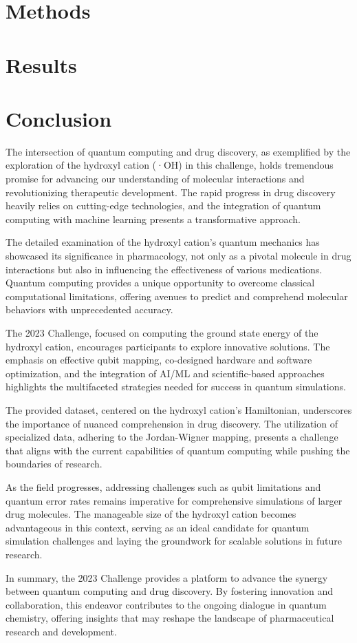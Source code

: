 \documentclass{article}
\begin{document}
\section{Methods}



\section{Results}

\section{Conclusion}
The intersection of quantum computing and drug discovery, as exemplified by the exploration of the hydroxyl cation (·OH) in this challenge, holds tremendous promise for advancing our understanding of molecular interactions and revolutionizing therapeutic development. The rapid progress in drug discovery heavily relies on cutting-edge technologies, and the integration of quantum computing with machine learning presents a transformative approach.

The detailed examination of the hydroxyl cation's quantum mechanics has showcased its significance in pharmacology, not only as a pivotal molecule in drug interactions but also in influencing the effectiveness of various medications. Quantum computing provides a unique opportunity to overcome classical computational limitations, offering avenues to predict and comprehend molecular behaviors with unprecedented accuracy.

The 2023 Challenge, focused on computing the ground state energy of the hydroxyl cation, encourages participants to explore innovative solutions. The emphasis on effective qubit mapping, co-designed hardware and software optimization, and the integration of AI/ML and scientific-based approaches highlights the multifaceted strategies needed for success in quantum simulations.

The provided dataset, centered on the hydroxyl cation's Hamiltonian, underscores the importance of nuanced comprehension in drug discovery. The utilization of specialized data, adhering to the Jordan-Wigner mapping, presents a challenge that aligns with the current capabilities of quantum computing while pushing the boundaries of research.

As the field progresses, addressing challenges such as qubit limitations and quantum error rates remains imperative for comprehensive simulations of larger drug molecules. The manageable size of the hydroxyl cation becomes advantageous in this context, serving as an ideal candidate for quantum simulation challenges and laying the groundwork for scalable solutions in future research.

In summary, the 2023 Challenge provides a platform to advance the synergy between quantum computing and drug discovery. By fostering innovation and collaboration, this endeavor contributes to the ongoing dialogue in quantum chemistry, offering insights that may reshape the landscape of pharmaceutical research and development.



\end{document}
